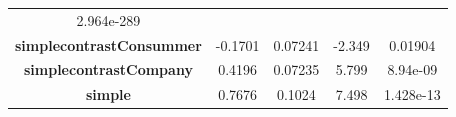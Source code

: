 \documentclass[]{article}
\begin{document}
\begin{longtable}[]{@{}ccccc@{}}
\begin{minipage}[t]{0.14\columnwidth}
2.964e-289\strut
\end{minipage}\tabularnewline
\begin{minipage}[t]{0.34\columnwidth}\centering\strut
\textbf{simplecontrastConsummer}\strut
\end{minipage} & \begin{minipage}[t]{0.12\columnwidth}\centering\strut
-0.1701\strut
\end{minipage} & \begin{minipage}[t]{0.15\columnwidth}\centering\strut
0.07241\strut
\end{minipage} & \begin{minipage}[t]{0.11\columnwidth}\centering\strut
-2.349\strut
\end{minipage} & \begin{minipage}[t]{0.14\columnwidth}\centering\strut
0.01904\strut
\end{minipage}\tabularnewline
\begin{minipage}[t]{0.34\columnwidth}\centering\strut
\textbf{simplecontrastCompany}\strut
\end{minipage} & \begin{minipage}[t]{0.12\columnwidth}\centering\strut
0.4196\strut
\end{minipage} & \begin{minipage}[t]{0.15\columnwidth}\centering\strut
0.07235\strut
\end{minipage} & \begin{minipage}[t]{0.11\columnwidth}\centering\strut
5.799\strut
\end{minipage} & \begin{minipage}[t]{0.14\columnwidth}\centering\strut
8.94e-09\strut
\end{minipage}\tabularnewline
\begin{minipage}[t]{0.34\columnwidth}\centering\strut
\textbf{simple}\strut
\end{minipage} & \begin{minipage}[t]{0.12\columnwidth}\centering\strut
0.7676\strut
\end{minipage} & \begin{minipage}[t]{0.15\columnwidth}\centering\strut
0.1024\strut
\end{minipage} & \begin{minipage}[t]{0.11\columnwidth}\centering\strut
7.498\strut
\end{minipage} & \begin{minipage}[t]{0.14\columnwidth}\centering\strut
1.428e-13\strut
\end{minipage}\tabularnewline
\bottomrule
\end{longtable}
\end{document}
